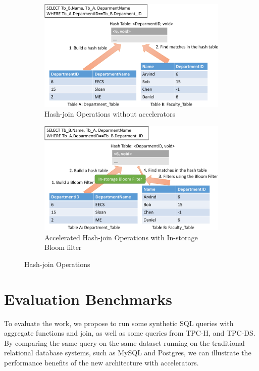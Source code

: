 \documentclass{article}
\begin{document}
\begin{figure}[!htb]
  \centering
  \begin{subfigure}[t]{0.48\textwidth}
    \includegraphics[width=\textwidth]{figures/hash-join-crop.pdf}
      \caption{Hash-join Operations without accelerators}
      \label{fig:hash-join}
  \end{subfigure}
  \begin{subfigure}[t]{0.48\textwidth}
    \includegraphics[width=\textwidth]{figures/filter-hash-join-crop.pdf}
    \caption{Accelerated Hash-join Operations with In-storage Bloom filter}
    \label{fig:filter-hash-join}
  \end{subfigure}
  \label{fig:try}
  \caption{Hash-join Operations}
\end{figure}


\section{Evaluation Benchmarks}
\label{sec:eval}
To evaluate the work, we propose to run some synthetic SQL queries with aggregate functions and join, as well as some queries from TPC-H, and TPC-DS.
By comparing the same query on the same dataset running on the traditional relational database systems, such as MySQL and Postgres, we can illustrate the performance benefits of the new architecture with accelerators.
\end{document}
